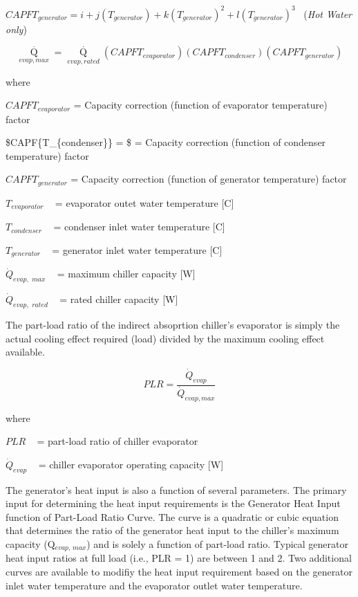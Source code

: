 \(CAPF{T_{generator}} = i + j\left( {{T_{generator}}} \right) + k{\left( {{T_{generator}}} \right)^2} + l{\left( {{T_{generator}}} \right)^3}\) ~(\emph{Hot Water only})

\begin{equation}
{\mathop Q\limits^\cdot_{evap,max}} = {\mathop Q\limits^\cdot_{evap,rated}}\left( {CAPF{T_{evaporator}}} \right)\left( {CAPF{T_{condenser}}} \right)\left( {CAPF{T_{generator}}} \right)
\end{equation}

where

\(CAPF{T_{evaporator}}\) = Capacity correction (function of evaporator temperature) factor

\$CAPF\{T\_\{condenser\}\} = \$ = Capacity correction (function of condenser temperature) factor

\(CAPF{T_{generator}}\) = Capacity correction (function of generator temperature) factor

\({T_{evaporator}}\) ~ = evaporator outet water temperature {[}C{]}

\({T_{condenser}}\) ~ = condenser inlet water temperature {[}C{]}

\({T_{generator}}\) ~ = generator inlet water temperature {[}C{]}

\({\dot Q_{evap,\,\,max}}\) ~ = maximum chiller capacity {[}W{]}

\({\dot Q_{evap,\,\,rated}}\) ~ = rated chiller capacity {[}W{]}

The part-load ratio of the indirect absoprtion chiller's evaporator is simply the actual cooling effect required (load) divided by the maximum cooling effect available.

\begin{equation}
  PLR = \frac{\dot{Q}_{evap}}{\dot{Q}_{evap,max}}
\end{equation}

where

\(PLR\) ~ = part-load ratio of chiller evaporator

\({\dot Q_{evap}}\) ~ = chiller evaporator operating capacity {[}W{]}

The generator's heat input is also a function of several parameters. The primary input for determining the heat input requirements is the Generator Heat Input function of Part-Load Ratio Curve. The curve is a quadratic or cubic equation that determines the ratio of the generator heat input to the chiller's maximum capacity (Q\(_{evap,\, max}\)) and is solely a function of part-load ratio. Typical generator heat input ratios at full load (i.e., PLR = 1) are between 1 and 2. Two additional curves are available to modifiy the heat input requirement based on the generator inlet water temperature and the evaporator outlet water temperature.

